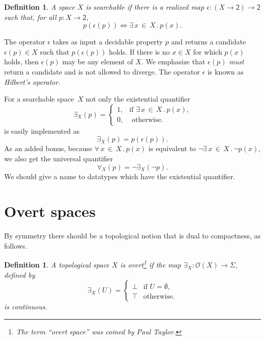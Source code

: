 \documentclass[a4paper,10pt]{article}
\newtheorem{definition}[theorem]{Definition}
\newcommand{\tpl}[1]{\mathcal{O}(#1)}
\newcommand{\two}{\mathsf{2}}
\newcommand{\xall}[3]{\forall\, #1 \,{\in}\, #2\,.\,#3}
\newcommand{\xsome}[3]{\exists\, #1 \,{\in}\, #2\,.\,#3}
\begin{document}
\begin{definition} A space $X$ is \emph{searchable} if there is a realized map $\epsilon : (X \to \two) \to \two$ such that, for all $p : X \to \two$,
    \begin{equation*} p (\epsilon(p)) \iff \xsome{x}{X}{p(x)}.
    \end{equation*}
\end{definition}

The operator $\epsilon$ takes as input a decidable property $p$ and returns a candidate $\epsilon(p) \in X$ such that $p(\epsilon(p))$ holds. If there is no $x \in X$ for which $p(x)$ holds, then $\epsilon(p)$ may be any element of $X$. We emphasize that $\epsilon(p)$ \emph{must} return a candidate and is not allowed to diverge. The operator $\epsilon$ is known as \emph{Hilbert's operator}.

For a searchable space~$X$ not only the existential quantifier
%
\begin{equation*} \exists_X(p) = \begin{cases} 1, &\text{if $\xsome{x}{X}{p(x)}$,}\\ 0, &\text{ otherwise.}
	\end{cases}
\end{equation*}
%
is easily implemented as
\begin{equation*} \exists_X(p) = p (\epsilon(p)).
\end{equation*}
%
As an added bonus, because $\xall{x}{X}{p(x)}$ is equivalent to $\lnot\xsome{x}{X}{\lnot p(x)}$, we also get the universal quantifier
%
\begin{equation*} \forall_X(p) = \lnot \exists_X(\lnot p).
\end{equation*}
%
We should give a name to datatypes which have the existential quantifier.

\section{Overt spaces}
\label{sec:overt-spaces}

By symmetry there should be a topological notion that is dual to compactness, as follows.

\begin{definition} A topological space $X$ is \emph{overt}\footnote{The term ``overt space'' was coined by Paul Taylor.} if the map $\exists_X : \tpl{X} \to \Sigma$, defined by
  \begin{equation*} \exists_X (U) =
    \begin{cases} \bot & \text{if $U = \emptyset$,}\\ \top & \text{otherwise.}
    \end{cases}
  \end{equation*}
  is continuous.
\end{definition}
\end{document}
